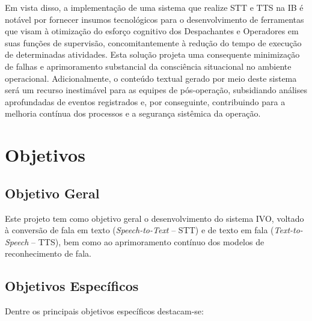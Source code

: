 \documentclass[
	12pt,				%
	a4paper,			%
	english,			%
	brazil,				%
	]{article}
\begin{document}
Em vista disso, a implementação de uma sistema que realize STT e TTS na IB é notável por fornecer insumos tecnológicos para o desenvolvimento de ferramentas que visam à otimização do esforço cognitivo dos Despachantes e Operadores em suas funções de supervisão, concomitantemente à redução do tempo de execução de determinadas atividades. Esta solução projeta uma consequente minimização de falhas e aprimoramento substancial da consciência situacional no ambiente operacional. Adicionalmente, o conteúdo textual gerado por meio deste sistema será um recurso inestimável para as equipes de pós-operação, subsidiando análises aprofundadas de eventos registrados e, por conseguinte, contribuindo para a melhoria contínua dos processos e a segurança sistêmica da operação.

\section{Objetivos}

\subsection{Objetivo Geral}

Este projeto tem como objetivo geral o desenvolvimento do sistema IVO, voltado à conversão de fala em texto (\textit{Speech-to-Text} – STT) e de texto em fala (\textit{Text-to-Speech} – TTS), bem como ao aprimoramento contínuo dos modelos de reconhecimento de fala.


\subsection{Objetivos Específicos}

Dentre os principais objetivos específicos destacam-se:
\end{document}
